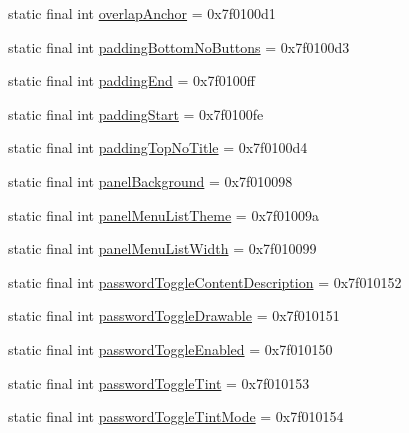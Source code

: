 \begin{CompactItemize}
\item 
static final int \hyperlink{classandroid_1_1support_1_1v7_1_1appcompat_1_1_r_1_1attr_bd2d3dcc8cc16f0d649053fe7c00219e}{overlapAnchor} = 0x7f0100d1
\item 
static final int \hyperlink{classandroid_1_1support_1_1v7_1_1appcompat_1_1_r_1_1attr_bd8215def44558bb8fcd4074221c4de3}{paddingBottomNoButtons} = 0x7f0100d3
\item 
static final int \hyperlink{classandroid_1_1support_1_1v7_1_1appcompat_1_1_r_1_1attr_9c11c32b28c0ee627466b17e8ad2c757}{paddingEnd} = 0x7f0100ff
\item 
static final int \hyperlink{classandroid_1_1support_1_1v7_1_1appcompat_1_1_r_1_1attr_4bac40afcb95edc302f74bfa5df72085}{paddingStart} = 0x7f0100fe
\item 
static final int \hyperlink{classandroid_1_1support_1_1v7_1_1appcompat_1_1_r_1_1attr_95171e7be2d0a7c970308e339681f305}{paddingTopNoTitle} = 0x7f0100d4
\item 
static final int \hyperlink{classandroid_1_1support_1_1v7_1_1appcompat_1_1_r_1_1attr_9040cf8b06e439b1e22ba13b69bc3659}{panelBackground} = 0x7f010098
\item 
static final int \hyperlink{classandroid_1_1support_1_1v7_1_1appcompat_1_1_r_1_1attr_3ee013313f39cd2f252d9288aa5deb4b}{panelMenuListTheme} = 0x7f01009a
\item 
static final int \hyperlink{classandroid_1_1support_1_1v7_1_1appcompat_1_1_r_1_1attr_f15465044564f9da5d115965abc26bc0}{panelMenuListWidth} = 0x7f010099
\item 
static final int \hyperlink{classandroid_1_1support_1_1v7_1_1appcompat_1_1_r_1_1attr_7950f71800f19316e98e7a26a15d0ef4}{passwordToggleContentDescription} = 0x7f010152
\item 
static final int \hyperlink{classandroid_1_1support_1_1v7_1_1appcompat_1_1_r_1_1attr_b4fea9de407efba12f9e52dbd9cbc277}{passwordToggleDrawable} = 0x7f010151
\item 
static final int \hyperlink{classandroid_1_1support_1_1v7_1_1appcompat_1_1_r_1_1attr_056ea0d01d047a8a2e3c7410ec144448}{passwordToggleEnabled} = 0x7f010150
\item 
static final int \hyperlink{classandroid_1_1support_1_1v7_1_1appcompat_1_1_r_1_1attr_f24ed10ab8ace48ca640b9b98aafc650}{passwordToggleTint} = 0x7f010153
\item 
static final int \hyperlink{classandroid_1_1support_1_1v7_1_1appcompat_1_1_r_1_1attr_3c4ba396f3341f74b8e62379642db9ce}{passwordToggleTintMode} = 0x7f010154
\item 

\end{CompactItemize}
